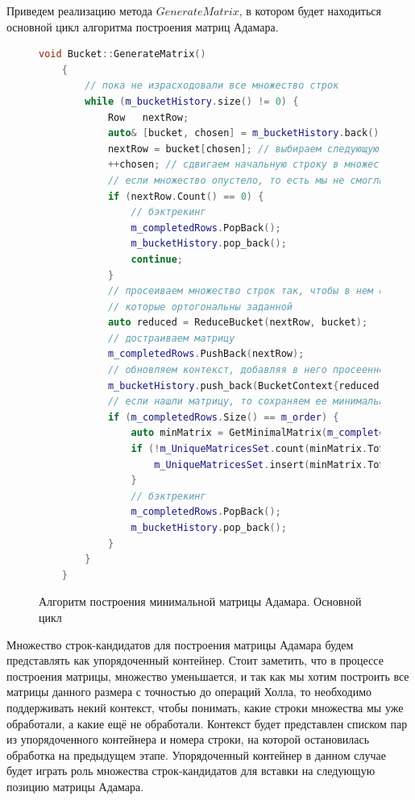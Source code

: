 Приведем реализацию метода $GenerateMatrix$, в котором будет находиться основной цикл алгоритма построения матриц Адамара.

\begin{figure}[H]
    \centering
    \begin{minipage}{\linewidth}
    \begin{lstlisting}[language=c++, tabsize=4, showspaces=false, basicstyle=\fontsize{9.5}{9.5}\selectfont, numbers=none]
    void Bucket::GenerateMatrix()
    {
        // пока не израсходовали все множество строк
        while (m_bucketHistory.size() != 0) {
            Row   nextRow;
            auto& [bucket, chosen] = m_bucketHistory.back();// берём ближайший контекст
            nextRow = bucket[chosen]; // выбираем следующую строку в матрице адамара
            ++chosen; // сдвигаем начальную строку в множестве
            // если множество опустело, то есть мы не смогли найти следующую строку
            if (nextRow.Count() == 0) {
                // бэктрекинг
                m_completedRows.PopBack();
                m_bucketHistory.pop_back();
                continue;
            }
            // просеиваем множество строк так, чтобы в нем остались только те строки,
            // которые ортогональны заданной
            auto reduced = ReduceBucket(nextRow, bucket);
            // достраиваем матрицу
            m_completedRows.PushBack(nextRow);
            // обновляем контекст, добавляя в него просеенное множество
            m_bucketHistory.push_back(BucketContext{reduced, 0});
            // если нашли матрицу, то сохраняем ее минимальное представление в set
            if (m_completedRows.Size() == m_order) {
                auto minMatrix = GetMinimalMatrix(m_completedRows,m_UniqueMatricesSet);
                if (!m_UniqueMatricesSet.count(minMatrix.ToString())) {
                    m_UniqueMatricesSet.insert(minMatrix.ToString());
                }
                // бэктрекинг
                m_completedRows.PopBack();
                m_bucketHistory.pop_back();
            }
        }
    }
    \end{lstlisting}
    \end{minipage}
    \caption{Алгоритм построения минимальной матрицы Адамара. Основной цикл}
    \label{alg:builder_main}
\end{figure}

Множество строк-кандидатов для построения матрицы Адамара будем представлять как упорядоченный контейнер. Стоит заметить, что в процессе построения матрицы, множество уменьшается, и так как мы хотим построить все матрицы данного размера с точностью до операций Холла, то необходимо поддерживать некий контекст, чтобы понимать, какие строки множества мы уже обработали, а какие ещё не обработали. Контекст будет представлен списком пар из упорядоченного контейнера и номера строки, на которой остановилась обработка на предыдущем этапе. Упорядоченный контейнер в данном случае будет играть роль множества строк-кандидатов для вставки на следующую позицию матрицы Адамара.

